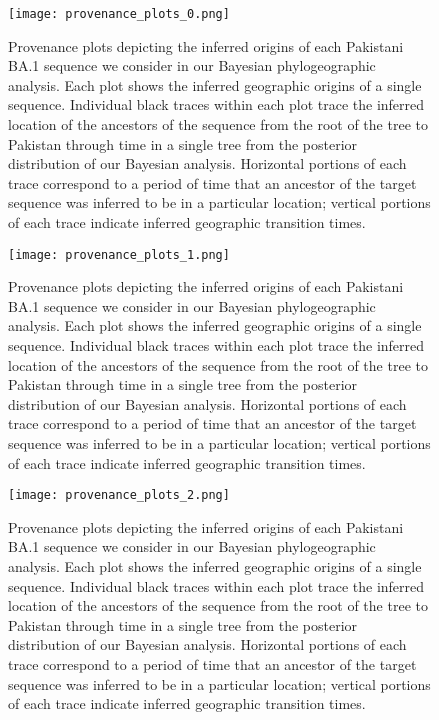 \begin{figure}[!htbp]%
    \centering
    \texttt{[image: provenance\_plots\_0.png]}
    \caption[Provenance plot 1]{Provenance plots depicting the inferred origins of each Pakistani BA.1 sequence we consider in our Bayesian phylogeographic analysis. Each plot shows the inferred geographic origins of a single sequence. Individual black traces within each plot trace the inferred location of the ancestors of the sequence from the root of the tree to Pakistan through time in a single tree from the posterior distribution of our Bayesian analysis. Horizontal portions of each trace correspond to a period of time that an ancestor of the target sequence was inferred to be in a particular location; vertical portions of each trace indicate inferred geographic transition times.}
    \label{sfig:prov0}
\end{figure}

\begin{figure}[!htbp]%
    \centering
    \texttt{[image: provenance\_plots\_1.png]}
    \caption[Provenance plot 2]{Provenance plots depicting the inferred origins of each Pakistani BA.1 sequence we consider in our Bayesian phylogeographic analysis. Each plot shows the inferred geographic origins of a single sequence. Individual black traces within each plot trace the inferred location of the ancestors of the sequence from the root of the tree to Pakistan through time in a single tree from the posterior distribution of our Bayesian analysis. Horizontal portions of each trace correspond to a period of time that an ancestor of the target sequence was inferred to be in a particular location; vertical portions of each trace indicate inferred geographic transition times.}
    \label{sfig:prov1}
\end{figure}

\begin{figure}[!htbp]%
    \centering
    \texttt{[image: provenance\_plots\_2.png]}
    \caption[Provenance plot 3]{Provenance plots depicting the inferred origins of each Pakistani BA.1 sequence we consider in our Bayesian phylogeographic analysis. Each plot shows the inferred geographic origins of a single sequence. Individual black traces within each plot trace the inferred location of the ancestors of the sequence from the root of the tree to Pakistan through time in a single tree from the posterior distribution of our Bayesian analysis. Horizontal portions of each trace correspond to a period of time that an ancestor of the target sequence was inferred to be in a particular location; vertical portions of each trace indicate inferred geographic transition times.}
    \label{sfig:prov2}
\end{figure}

